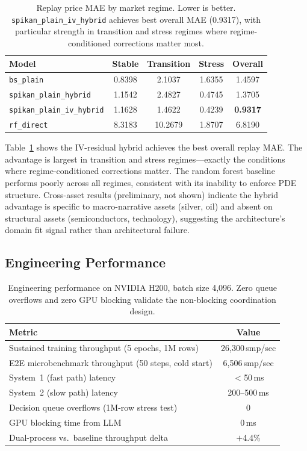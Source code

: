 \documentclass[11pt,a4paper]{article}
\begin{document}
\begin{table}[ht]
\centering
\caption{Replay price MAE by market regime. Lower is better. \texttt{spikan\_plain\_iv\_hybrid}
achieves best overall MAE (0.9317), with particular strength in transition and stress
regimes where regime-conditioned corrections matter most.}
\small
\begin{tabular}{@{}lcccc@{}}
\toprule
Model & Stable & Transition & Stress & Overall \\
\midrule
\texttt{bs\_plain}              & 0.8398 & 2.1037 & 1.6355 & 1.4597 \\
\texttt{spikan\_plain\_hybrid}  & 1.1542 & 2.4827 & 0.4745 & 1.3705 \\
\texttt{spikan\_plain\_iv\_hybrid} & 1.1628 & 1.4622 & 0.4239 & \textbf{0.9317} \\
\texttt{rf\_direct}             & 8.3183 & 10.2679 & 1.8707 & 6.8190 \\
\bottomrule
\end{tabular}
\label{tab:replay}
\end{table}

Table~\ref{tab:replay} shows the IV-residual hybrid achieves the best overall replay
MAE. The advantage is largest in transition and stress regimes---exactly the conditions
where regime-conditioned corrections matter. The random forest baseline performs poorly
across all regimes, consistent with its inability to enforce PDE structure. Cross-asset
results (preliminary, not shown) indicate the hybrid advantage is specific to
macro-narrative assets (silver, oil) and absent on structural assets (semiconductors,
technology), suggesting the architecture's domain fit signal rather than architectural
failure.

\subsection{Engineering Performance}

\begin{table}[ht]
\centering
\caption{Engineering performance on NVIDIA H200, batch size 4,096. Zero queue overflows
and zero GPU blocking validate the non-blocking coordination design.}
\small
\begin{tabular}{@{}lc@{}}
\toprule
Metric & Value \\
\midrule
Sustained training throughput (5 epochs, 1M rows) & 26,300\,smp/sec \\
E2E microbenchmark throughput (50 steps, cold start) & 6,506\,smp/sec \\
System~1 (fast path) latency & $<$50\,ms \\
System~2 (slow path) latency & 200--500\,ms \\
Decision queue overflows (1M-row stress test) & 0 \\
GPU blocking time from LLM & 0\,ms \\
Dual-process vs.\ baseline throughput delta & $+$4.4\% \\
\bottomrule
\end{tabular}
\label{tab:engineering}
\end{table}
\end{document}
